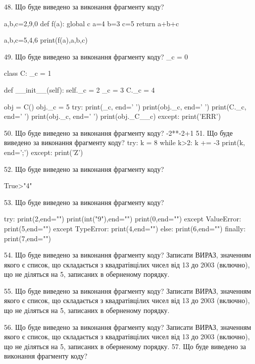 \documentclass[11pt]{article}
\begin{document}
48. Що буде виведено за виконання фрагменту коду?

a,b,c=2,9,0
def f(a):
global c    a=4
    b=3
    c=5
    return a+b+c

a,b,c=5,4,6
print(f(a),a,b,c)

49. Що буде виведено за виконання фрагменту коду?
_c = 0

class C:
    _c = 1
    
    def __init__(self):
        self._c = 2
        _c = 3
        C._c = 4

obj = C()
obj._c = 5
try:
    print(_c, end=' ')
    print(obj._c, end=' ')
    print(C._c, end=' ')
    print(obj._c, end=' ')
    print(obj._C__c)
except:
    print('ERR')

50. Що буде виведено за виконання фрагменту коду?
-2**-2+1
51. Що буде виведено за виконання фрагменту коду?
try:
    k = 8
    while k>2:
        k += -3
    print(k, end=';')
except:
    print('Z')

52. Що буде виведено за виконання фрагменту коду?

True>"4"

53. Що буде виведено за виконання фрагменту коду?

try:
    print(2,end="")
    print(int("9"),end="")
    print(0,end="")
except ValueError: print(5,end="")
except TypeError: print(4,end="")
else: print(6,end="")
finally: print(7,end="")


54. Що буде виведено за виконання фрагменту коду?
Записати ВИРАЗ, значенням якого є список, що складається з квадратівцілих чисел від 13 до 2003 (включно), що не діляться на 5, записаних в обернено\-му порядку.

55. Що буде виведено за виконання фрагменту коду?
Записати ВИРАЗ, значенням якого є список, що складається з квадратівцілих чисел від 13 до 2003 (включно), що не діляться на 5, записаних в обернено\-му порядку.

56. Що буде виведено за виконання фрагменту коду?
Записати ВИРАЗ, значенням якого є список, що складається з квадратівцілих чисел від 13 до 2003 (включно), що не діляться на 5, записаних в оберненому порядку.
57. Що буде виведено за виконання фрагменту коду?
\end{document}
